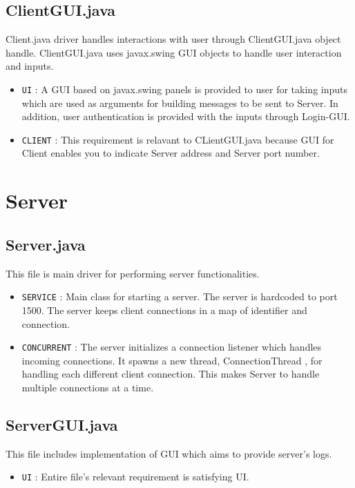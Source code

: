 \documentclass[12pt]{usenixsubmit}
\begin{document}
\subsection{ClientGUI.java} Client.java driver handles interactions with user through ClientGUI.java object handle. ClientGUI.java uses \textsf{javax.swing} GUI objects to handle user interaction and inputs.
\begin{itemize}
\item {\tt UI} : A GUI based on \textsf{javax.swing} panels is provided to user for taking inputs which are used as arguments for building messages to be sent to Server. In addition, user authentication is provided with the inputs through Login-GUI. 
 \item {\tt CLIENT} : This requirement is relavant to CLientGUI.java because GUI for Client enables you to indicate Server address and Server port number.
\end{itemize}

\section{Server}
\subsection{Server.java}This file is main driver for performing server functionalities.
\begin{itemize}
\item {\tt SERVICE} : Main class for starting a server. The server is hardcoded to port 1500. The server keeps client connections in a map of identifier and connection.
\item {\tt CONCURRENT} : The server initializes a connection listener which handles incoming connections. It spawns a new thread, ConnectionThread , for handling each different client connection. This makes Server to handle multiple connections at a time.
\end{itemize}

\subsection{ServerGUI.java}This file includes implementation of GUI which aims to provide server's logs.
\begin{itemize}
\item {\tt UI} : Entire file's relevant requirement is satisfying UI.  
\end{itemize}
\end{document}
